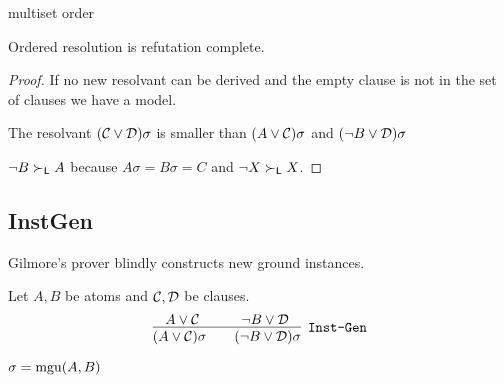 \begin{definition}
	multiset order
\end{definition}

\begin{lemma}
	Ordered resolution is refutation complete.
\end{lemma}

\begin{proof}
	If no new resolvant can be derived and the empty clause is not in the set of clauses we have a model.
	
	The resolvant $({\mathcal C}\lor{\mathcal D})\sigma$ is smaller than $(A\lor{\mathcal C})\sigma$ and $(\lnot B\lor{\mathcal D})\sigma$
	
	$\lnot B \succ_{\mathsf L} A$ because $A\sigma=B\sigma=C$ and $\lnot X\succ_{\mathsf L} X$.
\end{proof}








\subsection{InstGen}

Gilmore's prover blindly constructs new ground instances. 

\begin{definition}[\InstGen] Let $A, B$ be atoms and ${\mathcal C},{\mathcal D}$ be clauses.
	\begin{gather*}
	\infer
	[{\InstGen}] 
	{(A\lor\mathcal C)\sigma\qquad (\lnot B\lor\mathcal D)\sigma}
	{A\lor\mathcal C\quad&\quad \lnot B\lor\mathcal D}
	\end{gather*}
	\begin{center}$\sigma=\operatorname{mgu}(A,B)$
	\end{center}
\end{definition}

